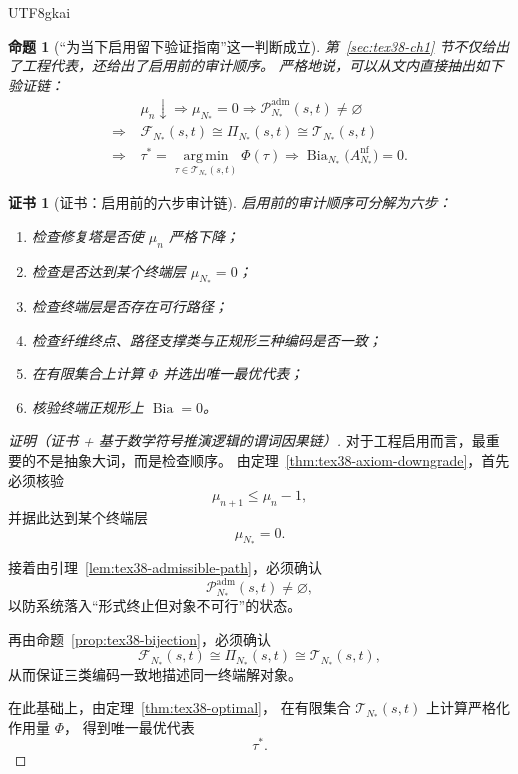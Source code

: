 \documentclass[12pt]{article}
\newtheorem{proposition}{命题}[section]
\newtheorem{Certificate}{证书}[section]
\newcommand{\Bia}{\operatorname{Bia}}
\begin{document}
\begin{CJK*}{UTF8}{gkai}
\begin{proposition}[“为当下启用留下验证指南”这一判断成立]
\label{prop:tex38-bridge-audit}
第~\ref{sec:tex38-ch1} 节不仅给出了工程代表，还给出了启用前的审计顺序。
严格地说，可以从文内直接抽出如下验证链：
\[
  \begin{aligned}
    &\mu_n\downarrow
    \Rightarrow
    \mu_{N_\ast}=0
    \Rightarrow
    \mathcal{P}^{\mathrm{adm}}_{N_\ast}(s,t)\neq\varnothing\\
    \Rightarrow\ &
    \mathcal{F}_{N_\ast}(s,t)\cong\Pi_{N_\ast}(s,t)\cong\mathcal{T}_{N_\ast}(s,t)\\
    \Rightarrow\ &
    \tau^\ast=\operatorname*{arg\,min}_{\tau\in\mathcal{T}_{N_\ast}(s,t)}\Phi(\tau)
    \Rightarrow
    \Bia_{N_\ast}\bigl(A_{N_\ast}^{\mathrm{nf}}\bigr)=0.
  \end{aligned}
\]
\end{proposition}

\begin{Certificate}[证书：启用前的六步审计链]
\label{cert:tex38-bridge-audit}
启用前的审计顺序可分解为六步：
\begin{enumerate}
  \item 检查修复塔是否使 $\mu_n$ 严格下降；
  \item 检查是否达到某个终端层 $\mu_{N_\ast}=0$；
  \item 检查终端层是否存在可行路径；
  \item 检查纤维终点、路径支撑类与正规形三种编码是否一致；
  \item 在有限集合上计算 $\Phi$ 并选出唯一最优代表；
  \item 核验终端正规形上 $\Bia=0$。
\end{enumerate}
\end{Certificate}

\begin{proof}[证明（证书 + 基于数学符号推演逻辑的谓词因果链）]
对于工程启用而言，最重要的不是抽象大词，而是检查顺序。
由定理~\ref{thm:tex38-axiom-downgrade}，首先必须核验
\[
  \mu_{n+1}\le\mu_n-1,
\]
并据此达到某个终端层
\[
  \mu_{N_\ast}=0.
\]

接着由引理~\ref{lem:tex38-admissible-path}，必须确认
\[
  \mathcal{P}^{\mathrm{adm}}_{N_\ast}(s,t)\neq\varnothing,
\]
以防系统落入“形式终止但对象不可行”的状态。

再由命题~\ref{prop:tex38-bijection}，必须确认
\[
  \mathcal{F}_{N_\ast}(s,t)\cong\Pi_{N_\ast}(s,t)\cong\mathcal{T}_{N_\ast}(s,t),
\]
从而保证三类编码一致地描述同一终端解对象。

在此基础上，由定理~\ref{thm:tex38-optimal}，
在有限集合 $\mathcal{T}_{N_\ast}(s,t)$ 上计算严格化作用量 $\Phi$，
得到唯一最优代表
\[
  \tau^\ast.
\]


\end{proof}
\end{CJK*}
\end{document}
